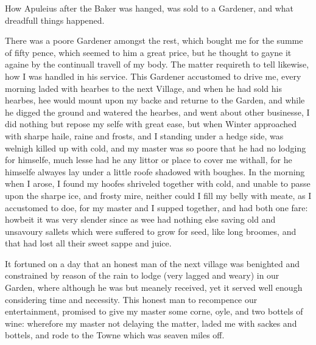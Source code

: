 
How Apuleius after the Baker was hanged, was sold to a Gardener, and what
dreadfull things happened.

There was a poore Gardener amongst the rest, which bought me for the summe of
fifty pence, which seemed to him a great price, but he thought to gayne it
againe by the continuall travell of my body. The matter requireth to tell
likewise, how I was handled in his service. This Gardener accustomed to drive
me, every morning laded with hearbes to the next Village, and when he had sold
his hearbes, hee would mount upon my backe and returne to the Garden, and while
he digged the ground and watered the hearbes, and went about other businesse, I
did nothing but repose my selfe with great ease, but when Winter approached
with sharpe haile, raine and frosts, and I standing under a hedge side, was
welnigh killed up with cold, and my master was so poore that he had no lodging
for himselfe, much lesse had he any littor or place to cover me withall, for he
himselfe alwayes lay under a little roofe shadowed with boughes. In the morning
when I arose, I found my hoofes shriveled together with cold, and unable to
passe upon the sharpe ice, and frosty mire, neither could I fill my belly with
meate, as I accustomed to doe, for my master and I supped together, and had
both one fare: howbeit it was very slender since as wee had nothing else saving
old and unsavoury sallets which were suffered to grow for seed, like long
broomes, and that had lost all their sweet sappe and juice.

It fortuned on a day that an honest man of the next village was benighted and
constrained by reason of the rain to lodge (very lagged and weary) in our
Garden, where although he was but meanely received, yet it served well enough
considering time and necessity. This honest man to recompence our
entertainment, promised to give my master some corne, oyle, and two bottels of
wine: wherefore my master not delaying the matter, laded me with sackes and
bottels, and rode to the Towne which was seaven miles off.

